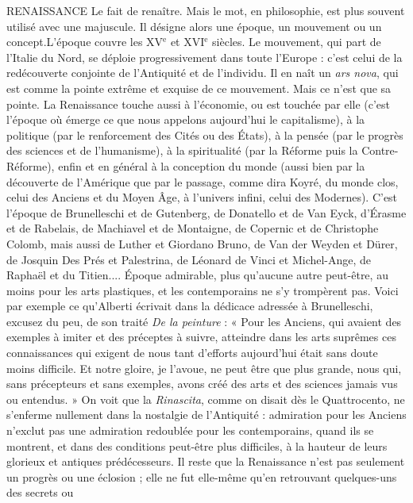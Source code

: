 RENAISSANCE Le fait de renaître. Mais le mot, en philosophie, est plus
souvent utilisé avec une majuscule. Il désigne alors une
époque, un mouvement ou un concept.L'époque couvre les
{\footnotesize XV$^\text{e}$} et {\footnotesize XVI$^\text{e}$} siècles.
Le mouvement, qui part de l'Italie du Nord, se déploie progressivement dans
toute l’Europe : c’est celui de la redécouverte conjointe de l'Antiquité et de
l'individu. Il en naît un {\it ars nova}, qui est comme la pointe extrême et exquise
de ce mouvement. Mais ce n’est que sa pointe. La Renaissance touche aussi à
l’économie, ou est touchée par elle (c’est l’époque où émerge ce que nous appelons
aujourd’hui le capitalisme), à la politique (par le renforcement des Cités
ou des États), à la pensée (par le progrès des sciences et de l’humanisme), à la
spiritualité (par la Réforme puis la Contre-Réforme), enfin et en général à la
conception du monde (aussi bien par la découverte de l'Amérique que par le
passage, comme dira Koyré, du monde clos, celui des Anciens et du Moyen
Âge, à l'univers infini, celui des Modernes). C’est l’époque de Brunelleschi et
de Gutenberg, de Donatello et de Van Eyck, d’Érasme et de Rabelais, de
Machiavel et de Montaigne, de Copernic et de Christophe Colomb, mais
aussi de Luther et Giordano Bruno, de Van der Weyden et Dürer, de Josquin
Des Prés et Palestrina, de Léonard de Vinci et Michel-Ange, de Raphaël et du
Titien.... Époque admirable, plus qu'aucune autre peut-être, au moins pour
les arts plastiques, et les contemporains ne s’y trompèrent pas. Voici par
exemple ce qu'Alberti écrivait dans la dédicace adressée à Brunelleschi,
excusez du peu, de son traité {\it De la peinture} : « Pour les Anciens, qui avaient
des exemples à imiter et des préceptes à suivre, atteindre dans les arts
suprêmes ces connaissances qui exigent de nous tant d’efforts aujourd’hui
était sans doute moins difficile. Et notre gloire, je l'avoue, ne peut être que
plus grande, nous qui, sans précepteurs et sans exemples, avons créé des arts
et des sciences jamais vus ou entendus. » On voit que la {\it Rinascita}, comme on
disait dès le Quattrocento, ne s’enferme nullement dans la nostalgie de
l'Antiquité : admiration pour les Anciens n'exclut pas une admiration
redoublée pour les contemporains, quand ils se montrent, et dans des conditions
peut-être plus difficiles, à la hauteur de leurs glorieux et antiques prédécesseurs.
Il reste que la Renaissance n’est pas seulement un progrès ou une
éclosion ; elle ne fut elle-même qu’en retrouvant quelques-uns des secrets ou

